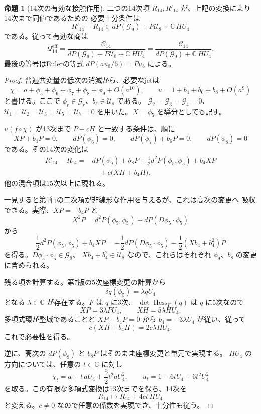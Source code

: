 \documentclass[a4paper,11pt]{ltjsarticle}
\theoremstyle{definition}
\newtheorem{proposition}[theorem]{命題}
\newcommand{\CC}{\mathbb C}
\begin{document}
\begin{proposition}[14次の有効な接触作用]
\label{prop:v11-effective-contact-fourteen}
二つの14次項 $R_{14},R'_{14}$ が、上記の変換により14次まで同値であるための
必要十分条件は
\[
 R'_{14}-R_{14}\in
 dP(\mathcal G_9)+P\mathcal U_8+\CC\,HU_4
\]
である。従って有効な商は
\begin{equation}\label{eq:v11-effective-fourteen-quotient}
 \mathcal Q^{\mathrm{eff}}_{14}
 =\frac{\mathcal C_{14}}
 {dP(\mathcal G_9)+P\mathcal U_8+\CC\,HU_4}
 =\frac{\mathcal C_{14}}
 {dP(\mathcal G_9)+\CC\,HU_4}.
\end{equation}
最後の等号はEulerの等式
$dP(au_8/6)=Pu_8$ による。
\end{proposition}
\begin{proof}
普遍共変量の低次の消滅から、必要なjetは
\[
 \chi=a+\phi_5+\phi_6+\phi_7+\phi_8+\phi_9+O(a^{10}),
 \qquad
 u=1+b_4+b_6+b_8+O(a^9)
\]
と書ける。ここで $\phi_r\in\mathcal G_r$、$b_s\in\mathcal U_s$ である。
$\mathcal G_2=\mathcal G_3=\mathcal G_4=0$、
$\mathcal U_1=\mathcal U_2=\mathcal U_3=\mathcal U_5=\mathcal U_7=0$
を用いた。$X=\phi_5$ を導分としても記す。

$u(f\circ\chi)$ が13次まで $P+cH$ と一致する条件は、順に
\[
 XP+b_4P=0,\qquad dP(\phi_6)=0,\qquad
 dP(\phi_7)+b_6P=0,\qquad dP(\phi_8)=0
\]
である。その14次の変化は
\begin{align*}
 R'_{14}-R_{14}
 ={}&dP(\phi_9)+b_8P
       +\frac12d^2P(\phi_5,\phi_5)+b_4XP\\
   &\quad+c\bigl(XH+b_4H\bigr).
\end{align*}
他の混合項は15次以上に現れる。

一見すると第1行の二次項が非線形な作用を与えるが、これは高次の変更へ
吸収できる。実際、$XP=-b_4P$ と
\[
 X^2P=d^2P(\phi_5,\phi_5)+dP(D\phi_5\cdot\phi_5)
\]
から
\[
 \frac12d^2P(\phi_5,\phi_5)+b_4XP
 =-\frac12dP(D\phi_5\cdot\phi_5)
  -\frac12(Xb_4+b_4^2)P
\]
を得る。$D\phi_5\cdot\phi_5\in\mathcal G_9$、
$Xb_4+b_4^2\in\mathcal U_8$ なので、これらはそれぞれ
$\phi_9$、$b_8$ の変更に含められる。

残る項を計算する。第7版の5次座標変更の計算から
\[
 \delta q(\phi_5)=\lambda qU_4
\]
となる $\lambda\in\CC$ が存在する。$F$ は $q$ に3次、
$\det\operatorname{Hess}_F(q)$ は $q$ に5次なので
\[
 XP=3\lambda PU_4,\qquad XH=5\lambda HU_4.
\]
多項式環が整域であることと $XP+b_4P=0$ から
$b_4=-3\lambda U_4$ が従い、従って
\[
 c(XH+b_4H)=2c\lambda HU_4.
\]
これで必要性を得る。

逆に、高次の $dP(\phi_9)$ と $b_8P$ はそのまま座標変更と単元で実現する。
$HU_4$ の方向については、任意の $t\in\CC$ に対し
\[
 \chi_t=a+t\,aU_4+\frac52t^2aU_4^2,
 \qquad u_t=1-6tU_4+6t^2U_4^2
\]
を取る。この有限な多項式変換は13次までを保ち、14次を
\[
 R_{14}\longmapsto R_{14}+4ct\,HU_4
\]
と変える。$c\ne0$ なので任意の係数を実現でき、十分性も従う。
\end{proof}
\end{document}
